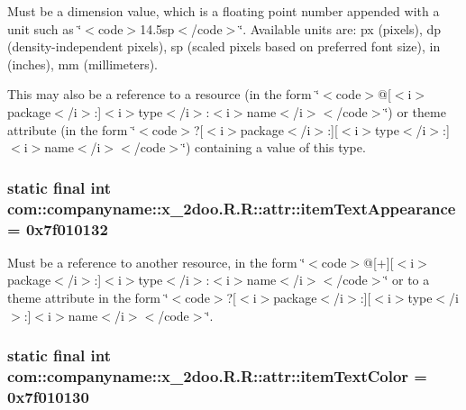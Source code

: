 Must be a dimension value, which is a floating point number appended with a unit such as \char`\"{}$<$code$>$14.5sp$<$/code$>$\char`\"{}. Available units are: px (pixels), dp (density-independent pixels), sp (scaled pixels based on preferred font size), in (inches), mm (millimeters). 

This may also be a reference to a resource (in the form \char`\"{}$<$code$>$@\mbox{[}$<$i$>$package$<$/i$>$:\mbox{]}$<$i$>$type$<$/i$>$:$<$i$>$name$<$/i$>$$<$/code$>$\char`\"{}) or theme attribute (in the form \char`\"{}$<$code$>$?\mbox{[}$<$i$>$package$<$/i$>$:\mbox{]}\mbox{[}$<$i$>$type$<$/i$>$:\mbox{]}$<$i$>$name$<$/i$>$$<$/code$>$\char`\"{}) containing a value of this type. \hypertarget{classcom_1_1companyname_1_1x__2doo_1_1_r_1_1attr_66c7cc66e44a9ca1584b16305786e7aa}{
\subsubsection[{itemTextAppearance}]{\setlength{\rightskip}{0pt plus 5cm}static final int com::companyname::x\_\-2doo.R.R::attr::itemTextAppearance = 0x7f010132}}
\label{classcom_1_1companyname_1_1x__2doo_1_1_r_1_1attr_66c7cc66e44a9ca1584b16305786e7aa}


Must be a reference to another resource, in the form \char`\"{}$<$code$>$@\mbox{[}+\mbox{]}\mbox{[}$<$i$>$package$<$/i$>$:\mbox{]}$<$i$>$type$<$/i$>$:$<$i$>$name$<$/i$>$$<$/code$>$\char`\"{} or to a theme attribute in the form \char`\"{}$<$code$>$?\mbox{[}$<$i$>$package$<$/i$>$:\mbox{]}\mbox{[}$<$i$>$type$<$/i$>$:\mbox{]}$<$i$>$name$<$/i$>$$<$/code$>$\char`\"{}. \hypertarget{classcom_1_1companyname_1_1x__2doo_1_1_r_1_1attr_6d1d4faf528fcb60014cc0da91efab94}{
\subsubsection[{itemTextColor}]{\setlength{\rightskip}{0pt plus 5cm}static final int com::companyname::x\_\-2doo.R.R::attr::itemTextColor = 0x7f010130}}
\label{classcom_1_1companyname_1_1x__2doo_1_1_r_1_1attr_6d1d4faf528fcb60014cc0da91efab94}


